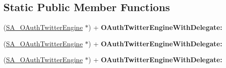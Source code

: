 \subsection*{\-Static \-Public \-Member \-Functions}
\begin{DoxyCompactItemize}
\item 
\hypertarget{interface_s_a___o_auth_twitter_engine_a596093b2101242def68e2d7d51f8f2ef}{
(\hyperlink{interface_s_a___o_auth_twitter_engine}{\-S\-A\-\_\-\-O\-Auth\-Twitter\-Engine} $\ast$) + {\bfseries \-O\-Auth\-Twitter\-Engine\-With\-Delegate\-:}}
\label{interface_s_a___o_auth_twitter_engine_a596093b2101242def68e2d7d51f8f2ef}

\item 
\hypertarget{interface_s_a___o_auth_twitter_engine_a596093b2101242def68e2d7d51f8f2ef}{
(\hyperlink{interface_s_a___o_auth_twitter_engine}{\-S\-A\-\_\-\-O\-Auth\-Twitter\-Engine} $\ast$) + {\bfseries \-O\-Auth\-Twitter\-Engine\-With\-Delegate\-:}}
\label{interface_s_a___o_auth_twitter_engine_a596093b2101242def68e2d7d51f8f2ef}

\item 
\hypertarget{interface_s_a___o_auth_twitter_engine_a596093b2101242def68e2d7d51f8f2ef}{
(\hyperlink{interface_s_a___o_auth_twitter_engine}{\-S\-A\-\_\-\-O\-Auth\-Twitter\-Engine} $\ast$) + {\bfseries \-O\-Auth\-Twitter\-Engine\-With\-Delegate\-:}}
\label{interface_s_a___o_auth_twitter_engine_a596093b2101242def68e2d7d51f8f2ef}

\end{DoxyCompactItemize}
